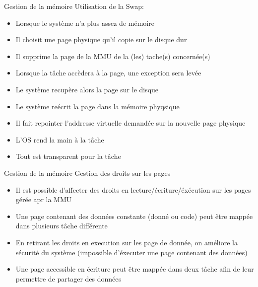 \begin{frame}{Gestion de la mémoire}
  Utilisation de la Swap:
  \begin{itemize}
  \item Lorsque le système n'a plus assez de mémoire
  \item Il choisit une page physique qu'il copie sur le disque dur
  \item  Il  supprime  la  page   de  la  MMU  de  la  (les)  tache(s)
    concernée(s)
  \item Lorsque la tâche accèdera à la page, une exception sera levée
  \item Le système recupère alors la page sur le disque
  \item Le système reécrit la page dans la mémoire phyqsique
  \item  Il  fait  repointer  l'addresse  virtuelle  demandée  sur  la
    nouvelle page physique
  \item L'OS rend la main à la tâche
  \item Tout est transparent pour la tâche
  \end{itemize}
\end{frame}

\begin{frame}{Gestion de la mémoire}
  Gestion des droits sur les pages
  \begin{itemize}
  \item    Il    est     possible    d'affecter    des    droits    en
    lecture/écriture/éxécution sur les pages gérée apr la MMU
  \item Une page contenant des  données constante (donné ou code) peut
    être mappée dans plusieurs tâche différente
  \item En retirant les droits en execution sur les page de donnée, on
    améliore la  sécurité du  système (impossible d'éxecuter  une page
    contenant des données)
  \item Une  page accessible  en écriture peut  être mappée  dans deux
    tâche afin de leur permettre de partager des données
    \end{itemize} 
\end{frame}

